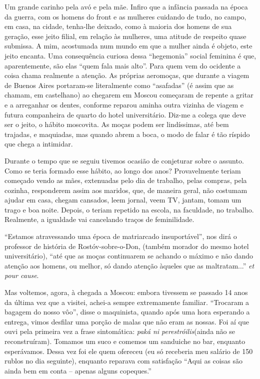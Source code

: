 Um grande carinho pela avó e pela mãe. Infiro que a infância passada na
época da guerra, com os homens do front e as mulheres cuidando de tudo,
no campo, em casa, na cidade, tenha-lhe deixado, como à maioria dos
homens de sua geração, esse jeito filial, em relação às mulheres, uma
atitude de respeito quase submissa. A mim, acostumada num mundo em que a
mulher ainda é objeto, este jeito encanta. Uma consequência curiosa
dessa ``hegemonia'' social feminina é que, aparentemente, são elas
``quem fala mais alto''. Para quem vem do ocidente a coisa chama
realmente a atenção. As próprias aeromoças, que durante a viagem de
Buenos Aires portaram-se literalmente como ``asafadas'' (é assim que as
chamam, em castelhano) ao chegarem em Moscou começaram de repente a
gritar e a arreganhar os dentes, conforme reparou aminha outra vizinha
de viagem e futura companheira de quarto do hotel universitário. Diz-me
a colega que deve ser o jeito, o hábito moscovita. As moças podem ser
lindíssimas, até bem trajadas, e maquiadas, mas quando abrem a boca, o
modo de falar é tão ríspido que chega a intimidar.

Durante o tempo que se seguiu tivemos ocasião de conjeturar sobre o
assunto. Como se teria formado esse hábito, ao longo dos anos?
Provavelmente teriam começado vendo as mães, extenuadas pelo dia de
trabalho, pelas compras, pela cozinha, responderem assim aos maridos,
que, de maneira geral, não costumam ajudar em casa, chegam cansados,
leem jornal, veem TV, jantam, tomam um trago e boa noite. Depois, o
teriam repetido na escola, na faculdade, no trabalho. Realmente, a
igualdade vai cancelando traços de feminilidade.

``Estamos atravessando uma época de matriarcado insuportável'', nos dirá
o professor de história de Rostóv-sobre-o-Don, (também morador do mesmo
hotel universitário), ``até que as moças continuarem se achando o máximo
e não dando atenção aos homens, ou melhor, só dando atenção àqueles que
as maltratam...'' \emph{et pour cause}.

Mas voltemos, agora, à chegada a Moscou: embora tivessem se passado 14
anos da última vez que a visitei, achei-a sempre extremamente familiar.
``Trocaram a bagagem do nosso vôo'', disse o maquinista, quando após uma
hora esperando a entrega, vimos desfilar uma porção de malas que não
eram as nossas. Foi aí que ouvi pela primeira vez a frase sintomática:
\emph{paká ni perestróilis}(ainda não se reconstruíram). Tomamos um suco
e comemos um sanduiche no bar, enquanto esperávamos. Dessa vez foi ele
quem ofereceu (eu só receberia meu salário de 150 rublos no dia
seguinte), enquanto reparava com satisfação ``Aqui as coisas são ainda
bem em conta -- apenas alguns copeques.''

